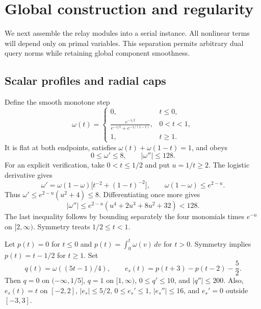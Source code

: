 \documentclass[11pt,letterpaper]{article}
\theoremstyle{definition}
\theoremstyle{remark}
\begin{document}
\section{Global construction and regularity}
\label{sec:construction}

We next assemble the relay modules into a serial instance.
All nonlinear terms will depend only on primal variables.  This
separation permits arbitrary dual query norms while retaining global
component smoothness.

\subsection{Scalar profiles and radial caps}
\label{sec:profiles-caps}

Define the smooth monotone step
\[
 \omega(t)=
 \begin{cases}
 0,&t\le0,\\
 \displaystyle\frac{e^{-1/t}}{e^{-1/t}+e^{-1/(1-t)}},&0<t<1,\\
 1,&t\ge1.
 \end{cases}
\]
It is flat at both endpoints, satisfies
$\omega(t)+\omega(1-t)=1$, and obeys
\begin{equation}
 0\le\omega'\le8,\qquad |\omega''|\le128.
 \label{eq:omega-bounds}
\end{equation}
For an explicit verification, take $0<t\le1/2$ and put $u=1/t\ge2$.
The logistic derivative gives
\[
 \omega'
 =\omega(1-\omega)\bigl[t^{-2}+(1-t)^{-2}\bigr],
 \qquad \omega(1-\omega)\le e^{2-u}.
\]
Thus $\omega'\le e^{2-u}(u^2+4)\le8$.
Differentiating once more gives
\[
 |\omega''|
 \le e^{2-u}(u^4+2u^3+8u^2+32)<128.
\]
The last inequality follows by bounding separately the four monomials
times $e^{-u}$ on $[2,\infty)$.
Symmetry treats $1/2\le t<1$.

Let $p(t)=0$ for $t\le0$ and
$p(t)=\int_0^t\omega(v)\,dv$ for $t>0$.  Symmetry implies
$p(t)=t-1/2$ for $t\ge1$.  Set
\begin{equation}
 q(t)=\omega((5t-1)/4),\qquad
 e_s(t)=p(t+3)-p(t-2)-\frac52.
 \label{eq:scalar-profiles}
\end{equation}
Then $q=0$ on $(-\infty,1/5]$, $q=1$ on $[1,\infty)$,
$0\le q'\le10$, and $|q''|\le200$.
Also, $e_s(t)=t$ on $[-2,2]$, $|e_s|\le5/2$,
$0\le e_s'\le1$, $|e_s''|\le16$, and $e_s'=0$ outside $[-3,3]$.
\end{document}
